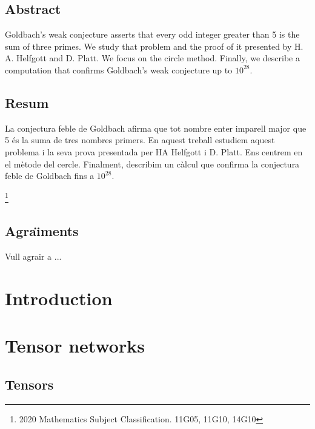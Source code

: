 \documentclass[11pt,a4paper,openright,oneside]{book}
\numberwithin{equation}{section}
\begin{document}
\newpage
{} 

\section*{Abstract}

Goldbach's weak conjecture asserts that every odd integer greater than 5 is the sum of three primes. We study that problem and the proof of it presented by H. A. Helfgott and D. Platt. We focus on the circle method. Finally, we describe a computation that confirms Goldbach's weak conjecture up to $10^{28}$.

\section*{Resum}
La conjectura feble de Goldbach afirma que tot nombre enter imparell major que 5 \'es la suma de tres nombres primers. En aquest treball estudiem aquest problema i la seva prova presentada per HA Helfgott i D. Platt. Ens centrem en el m\`etode del cercle. Finalment, describim un c\`alcul que confirma la conjectura feble de Goldbach fins a $10^{28}$.



{\let\thefootnote\relax\footnote{2020 Mathematics Subject Classification. 11G05, 11G10, 14G10}}



\newpage 


\section*{Agra\"{\i}ments}

Vull agrair a ... 
\newpage

\tableofcontents

\newpage

\setcounter{page}{1}
\chapter{Introduction}


\newpage

\chapter{Tensor networks}

\section{Tensors}
\end{document}
